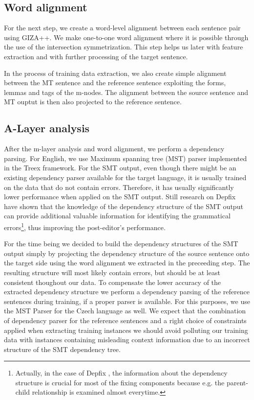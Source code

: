 \subsection{Word alignment}

For the next step, we create a word-level alignment between each sentence pair
using GIZA++\cite{och:ney:2000}. We make one-to-one word alignment where it is possible
through the use of the intersection symmetrization. This step helps us later with feature extraction
and with further processing of the target sentence.

In the process of training data extraction, we also create simple alignment between
the MT sentence and the reference sentence exploiting the forms, lemmas and tags
of the m-nodes. The alignment between the source sentence and MT ouptut is then also
projected to the reference sentence.

\subsection{A-Layer analysis}

After the m-layer analysis and word alignment, we perform a dependency parsing.
For English, we use Maximum spanning tree (MST) parser\cite{mcdonald:pereira:ribarov:hajic:2005}
implemented in the Treex framework. For the SMT output, even though there might
be an existing dependency parser available for the target language, it is usually
trained on the data that do not contain errors. Therefore, it has usually significantly
lower performance when applied on the SMT output. Still research on Depfix have shown
that the knowledge of the dependency structure of the SMT output can provide additional
valuable information for identifying the grammatical errors\footnote{Actually, in the case of Depfix
, the information about the dependency structure is crucial for most of the fixing components
because e.g. the parent-child relationship is examined almost everytime.}, thus improving
the post-editor's performance.

For the time being we decided to build the dependency structures of the SMT output simply
by projecting the dependency structure of the source sentence onto the target side
using the word alignment we extracted in the preceeding step. The resulting structure
will most likely contain errors, but should be at least consistent thoughout our data.
To compensate the lower accuracy of the extracted dependency structure we perform
a dependency parsing of the reference sentences during training, if a proper parser
is available. For this purposes, we use the MST Parser for the Czech language as well.
We expect that the combination of dependency parser for the reference sentences and
a right choice of constraints applied when extracting training instances we should
avoid polluting our training data with instances containing misleading context information
due to an incorrect structure of the SMT dependency tree.

